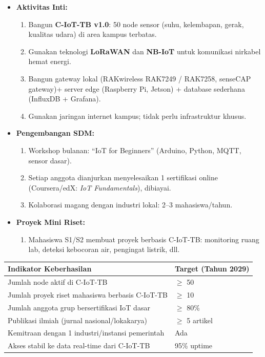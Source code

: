 \documentclass[11pt,a4paper]{article}
\begin{document}
\begin{itemize}
    \item \textbf{Aktivitas Inti:}
          \begin{enumerate}
              \item Bangun \textbf{C-IoT-TB v1.0}: 50 node sensor (suhu, kelembapan, gerak, kualitas udara) di area kampus terbatas.
              \item Gunakan teknologi \textbf{LoRaWAN} dan \textbf{NB-IoT} untuk komunikasi nirkabel hemat energi.
              \item Bangun gateway lokal (RAKwireless RAK7249 / RAK7258, senseCAP gateway)+ server edge (Raspberry Pi, Jetson) + database sederhana (InfluxDB + Grafana).
              \item Gunakan jaringan internet kampus; tidak perlu infrastruktur khusus.
          \end{enumerate}

    \item \textbf{Pengembangan SDM:}
          \begin{enumerate}
              \item Workshop bulanan: “IoT for Beginners” (Arduino, Python, MQTT, sensor dasar).
              \item Setiap anggota dianjurkan menyelesaikan 1 sertifikasi online (Coursera/edX: \textit{IoT Fundamentals}), dibiayai.
              \item Kolaborasi magang dengan industri lokal: 2–3 mahasiswa/tahun.
          \end{enumerate}

    \item \textbf{Proyek Mini Riset:}
          \begin{enumerate}
              \item Mahasiswa S1/S2 membuat proyek berbasis C-IoT-TB: monitoring ruang lab, deteksi kebocoran air, pengingat listrik, dll.
          \end{enumerate}
\end{itemize}

\begin{center}
    \begin{tabular}{ll}
        \toprule
        \textbf{Indikator Keberhasilan}                 & \textbf{Target (Tahun 2029)} \\
        \midrule
        Jumlah node aktif di C-IoT-TB                   & $\geq$ 50                    \\
        Jumlah proyek riset mahasiswa berbasis C-IoT-TB & $\geq$ 10                    \\
        Jumlah anggota grup bersertifikasi IoT dasar    & $\geq$ 80\%                  \\
        Publikasi ilmiah (jurnal nasional/lokakarya)    & $\geq$ 5 artikel             \\
        Kemitraan dengan 1 industri/instansi pemerintah & Ada                          \\
        Akses stabil ke data real-time dari C-IoT-TB    & 95\% uptime                  \\
        \bottomrule
    \end{tabular}
\end{center}
\end{document}

